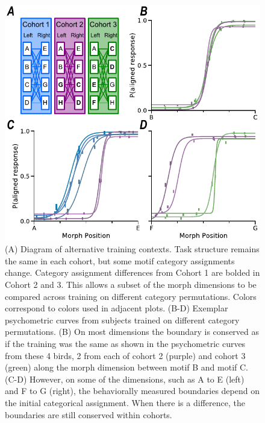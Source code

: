 \begin{figure}[tbp] 
  \centering
  \includegraphics[width=114mm]{figures/fig03_shift.pdf}
  \caption[Different training context sometimes results in reliable shifts in the psychometric curves]
{
(A)	Diagram of alternative training contexts. Task structure remains the same in each cohort, but some motif category assignments change. Category assignment differences from Cohort 1 are bolded in Cohort 2 and 3. This allows a subset of the morph dimensions to be compared across training on different category permutations. Colors correspond to colors used in adjacent plots.
(B-D)	Exemplar psychometric curves from subjects trained on different category permutations. 
(B)	On most dimensions the boundary is conserved as if the training was the same as shown in the psychometric curves from these 4 birds, 2 from each of cohort 2 (purple) and cohort 3 (green) along the morph dimension between motif B and motif C. 
(C-D)	However, on some of the dimensions, such as A to E (left) and F to G (right), the behaviorally measured boundaries depend on the initial categorical assignment.  When there is a difference, the boundaries are still conserved within cohorts.
}
  \label{fig:shift}
\end{figure}